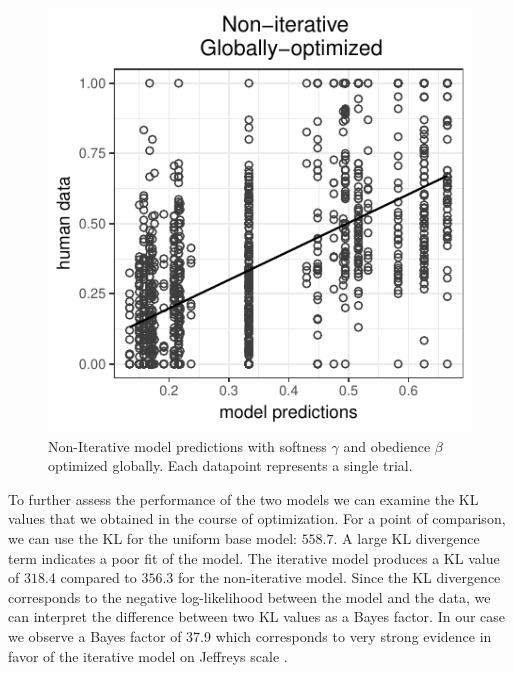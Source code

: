 \documentclass[10pt,a4paper]{article}
\begin{document}
 \begin{figure}
	\centering
	\includegraphics[width=.8\linewidth]{images/m8.pdf}
	\caption{Non-Iterative model predictions with softness $\gamma$ and obedience $\beta$ optimized globally. Each datapoint represents a single trial.}	
	\label{non-iterative}
\end{figure}
 
 To further assess the performance of the two models we can examine the KL values that we obtained in the course of optimization. For a point of comparison, we can use the KL for the uniform base model: $558.7$. A large KL divergence term indicates a poor fit of the model.
 The iterative model produces a KL value of $318.4$ compared to $356.3$ for the non-iterative model. Since the KL divergence corresponds to the negative log-likelihood between the model and the data, we can interpret the difference between two KL values as a Bayes factor. In our case we observe a Bayes factor of 37.9 which corresponds to very strong evidence in favor of the iterative model on Jeffreys scale \cite{jeffreys1961theory}.
\end{document}
